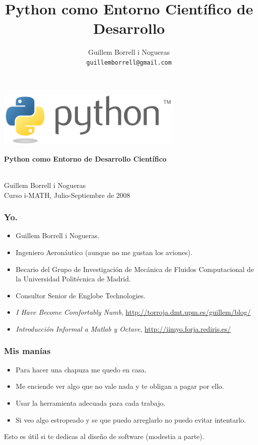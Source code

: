 \documentclass{beamer}
\title{Python como Entorno Científico de Desarrollo}
\author{
Guillem Borrell i Nogueras\\
\texttt{guillemborrell@gmail.com}
}
\begin{document}
\begin{frame}
\begin{center}
 \includegraphics[width=9cm]{files/python-logo-generic.pdf}\\
\begin{large}
\textbf{Python como Entorno de Desarrollo Científico}
\end{large}\\

Guillem Borrell i Nogueras\\

Curso i-MATH, Julio-Septiembre de 2008
\end{center}

\end{frame}


\begin{frame}
  \frametitle{Yo.}
  \begin{itemize}
  \item Guillem Borrell i Nogueras.
  \item Ingeniero Aeronáutico (aunque no me gustan los aviones).
  \item Becario del Grupo de Investigación de Mecánica de Fluidos
    Computacional de la Universidad Politécnica de Madrid.
  \item Consultor Senior de Englobe Technologies.
  \item \textit{I Have Become Comfortably Numb},
    \url{http://torroja.dmt.upm.es/guillem/blog/}
  \item \textit{Introducción Informal a Matlab y Octave},
    \url{http://iimyo.forja.rediris.es/}
  \end{itemize}
\end{frame}

\begin{frame}
  \frametitle{Mis manías}
  \begin{itemize}
  \item Para hacer una chapuza me quedo en casa.
  \item Me enciende ver algo que no vale nada y te obligan a pagar por
    ello.
  \item Usar la herramienta adecuada para cada trabajo.
  \item Si veo algo estropeado y se que puedo arreglarlo no puedo
    evitar intentarlo.
  \end{itemize}
Esto es útil si te dedicas al diseño de software (modestia a parte).
\end{frame}
\end{document}
